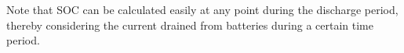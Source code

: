 \documentclass[review]{elsarticle}
\begin{document}
Note that SOC can be calculated easily at any point during the discharge period, thereby considering the current drained from batteries during a certain time period. %
%
%
%
%
%
%
%
\end{document}

